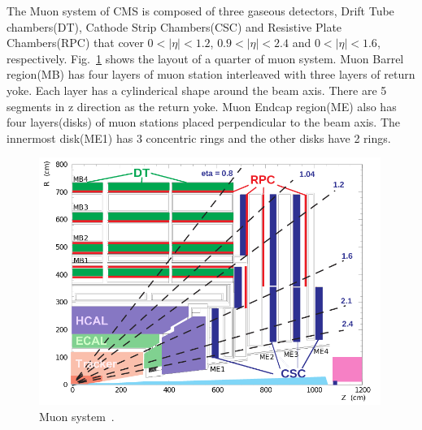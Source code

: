 The Muon system of CMS is composed of three gaseous detectors, 
Drift Tube chambers(DT), Cathode Strip Chambers(CSC) and Resistive Plate Chambers(RPC) 
that cover $0<|\eta|<1.2$, $0.9<|\eta|<2.4$ and $0<|\eta|<1.6$, respectively.
Fig.~\ref{fig:muon_system} shows the layout of a quarter of muon system. 
Muon Barrel region(MB) has four layers of muon station interleaved with 
three layers of return yoke. Each layer has a cylinderical shape around 
the beam axis. There are 5 segments in z direction as the return yoke. 
Muon Endcap region(ME) also has four layers(disks) of muon stations
placed perpendicular to the beam axis.
The innermost disk(ME1) has 3 concentric rings and the other disks 
have 2 rings. 
%
\begin{figure}[h] 
\vspace{1cm}
\includegraphics[width=0.99\textwidth]{figures/MuonSys-mod3.png}
\caption{Muon system~\cite{Kim:2012ix}.}
\label{fig:muon_system} 
\end{figure} 

